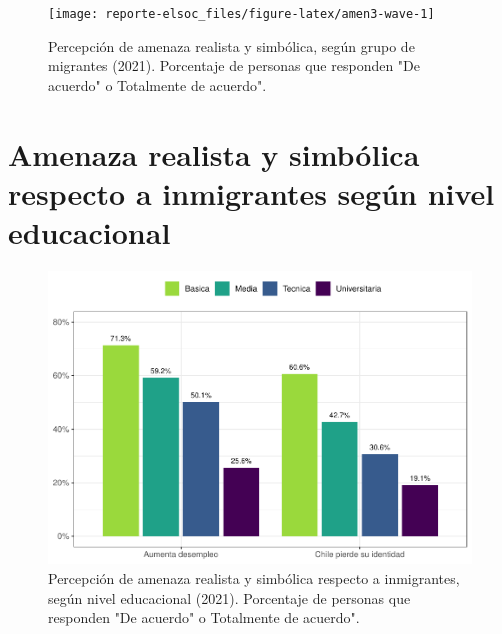 \documentclass[
  12pt,
  openany]{book}
\begin{document}
\begin{figure}

{\centering \texttt{[image: reporte-elsoc\_files/figure-latex/amen3-wave-1]} 

}

\caption{Percepción de amenaza realista y simbólica, según grupo de migrantes (2021). Porcentaje de personas que responden "De acuerdo" o Totalmente de acuerdo".}\label{fig:amen3-wave}
\end{figure}

\hypertarget{amenaza-realista-y-simbuxf3lica-respecto-a-inmigrantes-seguxfan-nivel-educacional}{%
\section{Amenaza realista y simbólica respecto a inmigrantes según nivel educacional}\label{amenaza-realista-y-simbuxf3lica-respecto-a-inmigrantes-seguxfan-nivel-educacional}}

\begin{figure}

{\centering \includegraphics{reporte-elsoc_files/figure-latex/amen-educ-1} 

}

\caption{Percepción de amenaza realista y simbólica respecto a inmigrantes, según nivel educacional (2021). Porcentaje de personas que responden "De acuerdo" o Totalmente de acuerdo".}\label{fig:amen-educ}
\end{figure}
\end{document}
